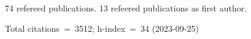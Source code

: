 74 refereed publications. 13 refeered publications as first author.

Total citations~=~3512; h-index~=~34 (2023-09-25)